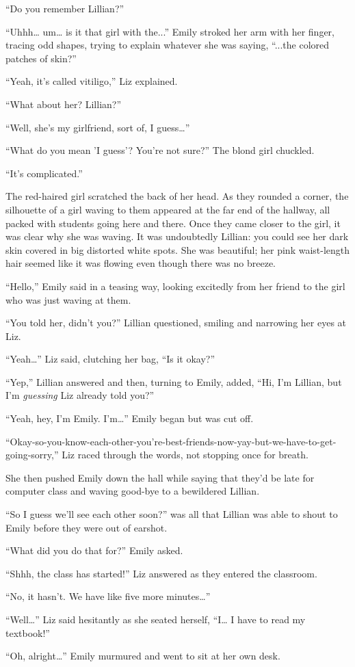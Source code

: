 “Do you remember Lillian?”

“Uhhh… um… is it that girl with the...” Emily stroked her arm with her finger, tracing odd shapes, trying to explain whatever she was saying, “...the colored patches of skin?”

“Yeah, it's called vitiligo,” Liz explained.

“What about her? Lillian?”

“Well, she's my girlfriend, sort of, I guess…”

“What do you mean 'I guess'? You're not sure?” The blond girl chuckled.

“It's complicated.”

The red-haired girl scratched the back of her head. As they rounded a corner, the silhouette of a girl waving to them appeared at the far end of the hallway, all packed with students going here and there. Once they came closer to the girl, it was clear why she was waving. It was undoubtedly Lillian: you could see her dark skin covered in big distorted white spots. She was beautiful; her pink waist-length hair seemed like it was flowing even though there was no breeze.

“Hello,” Emily said in a teasing way, looking excitedly from her friend to the girl who was just waving at them.

“You told her, didn't you?” Lillian questioned, smiling and narrowing her eyes at Liz.

“Yeah…” Liz said, clutching her bag, “Is it okay?”

“Yep,” Lillian answered and then, turning to Emily, added, “Hi, I'm Lillian, but I'm \textit{guessing} Liz already told you?”

“Yeah, hey, I'm Emily. I'm…” Emily began but was cut off.

“Okay-so-you-know-each-other-you're-best-friends-now-yay-but-we-have-to-get-going-sorry,” Liz raced through the words, not stopping once for breath.

She then pushed Emily down the hall while saying that they'd be late for computer class and waving good-bye to a bewildered Lillian.

“So I guess we'll see each other soon?” was all that Lillian was able to shout to Emily before they were out of earshot.

“What did you do that for?” Emily asked.

“Shhh, the class has started!” Liz answered as they entered the classroom.

“No, it hasn't. We have like five more minutes…”

“Well…” Liz said hesitantly as she seated herself, “I… I have to read my textbook!”

“Oh, alright…” Emily murmured and went to sit at her own desk.